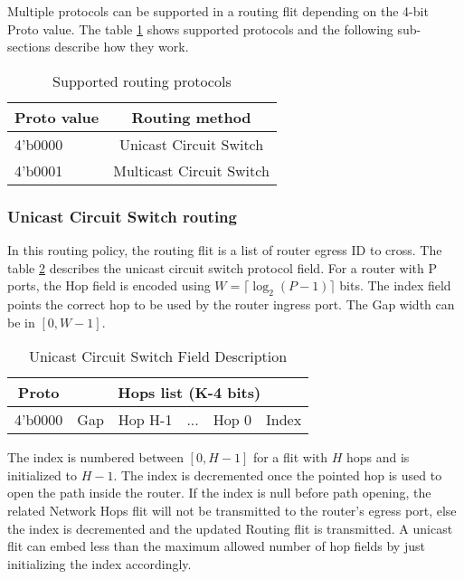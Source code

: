 Multiple protocols can be supported in a routing flit depending on the 4-bit Proto value. The table
\ref{supported_protocol} shows supported protocols and the following sub-sections describe how they work.


\begin{table}[h]
  \centering
  \begin{tabular}{l | c}
    \toprule\hline
    \textbf{Proto value} & \textbf{Routing method} \\
    \hline\hline
    4'b0000 & Unicast Circuit Switch \\
    \hline
    4'b0001 & Multicast Circuit Switch \\
    \hline\bottomrule
  \end{tabular}
  \caption{Supported routing protocols}
  \label{supported_protocol}
\end{table}


\subsubsection{Unicast Circuit Switch routing}

In this routing policy, the routing flit is a list of router egress ID to cross. The table
\ref{unicast_circuit_switch_field} describes the unicast circuit switch protocol field. For a router with P ports, the
Hop field is encoded using $W=\lceil \log_2(P-1)\rceil$ bits. The index field points the correct hop to be used by the
router ingress port. The Gap width can be in $[0, W-1]$.

\begin{table}[h]
  \centering
  \begin{tabular}{c | c | c | c | c | c}
    \toprule
    \hline
    \textbf{Proto} & \multicolumn{5}{c}{\textbf{Hops list (K-4 bits)}} \\
    \hline\hline
    4'b0000 & Gap & Hop H-1 & ... & Hop 0 & Index \\
    \hline
    \bottomrule
  \end{tabular}
  \caption{Unicast Circuit Switch Field Description}
  \label{unicast_circuit_switch_field}
\end{table}

The index is numbered between $[0, H-1]$ for a flit with $H$ hops and is initialized to $H-1$. The index is decremented
once the pointed hop is used to open the path inside the router. If the index is null before path opening, the related
Network Hops flit will not be transmitted to the router's egress port, else the index is decremented and the updated
Routing flit is transmitted. A unicast flit can embed less than the maximum allowed number of hop fields by just
initializing the index accordingly.

